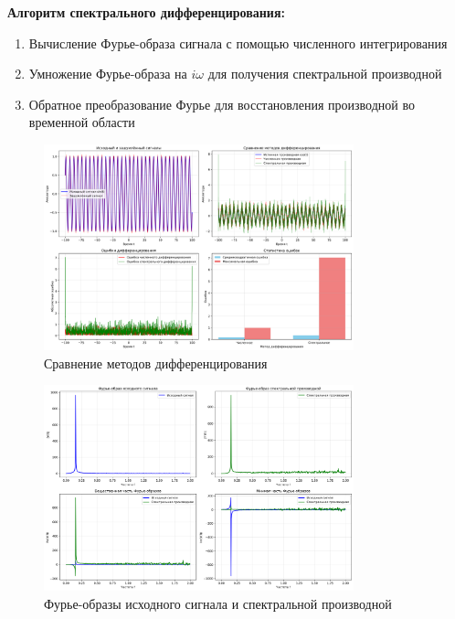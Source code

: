 \textbf{Алгоритм спектрального дифференцирования:}
\begin{enumerate}
    \item Вычисление Фурье-образа сигнала с помощью численного интегрирования
    \item Умножение Фурье-образа на $i\omega$ для получения спектральной производной
    \item Обратное преобразование Фурье для восстановления производной во временной области
\end{enumerate}

\begin{figure}[H]
    \centering
    \includegraphics[width=0.8\textwidth]{images/task1/spectral_differentiation_comparison.png}
    \caption{Сравнение методов дифференцирования}
    \label{fig:spectral_diff_comparison}
\end{figure}

\begin{figure}[H]
    \centering
    \includegraphics[width=0.8\textwidth]{images/task1/spectral_differentiation_fourier.png}
    \caption{Фурье-образы исходного сигнала и спектральной производной}
    \label{fig:spectral_diff_fourier}
\end{figure}

